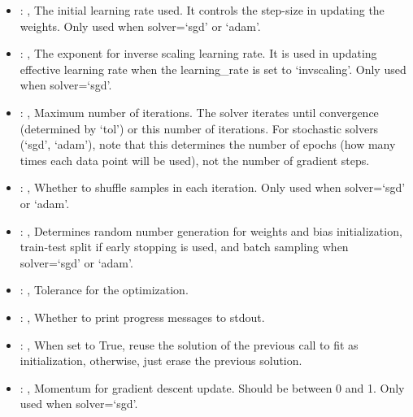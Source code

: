 \begin{itemize}
    \item {}: , 
      The initial learning rate used. It controls the step-size in updating the weights.
      Only used when solver=`sgd' or `adam'.

    \item {}: , 
      The exponent for inverse scaling learning rate. It is used in updating effective
      learning rate when the learning\_rate is set to `invscaling'. Only used when solver=`sgd'.

    \item {}: , 
      Maximum number of iterations. The solver iterates until convergence
      (determined by `tol') or this number of iterations. For stochastic solvers (`sgd', `adam'),
      note that this determines the number of epochs (how many times each data point will be used),
      not the number of gradient steps.

    \item {}: , 
      Whether to shuffle samples in each iteration. Only used when solver=`sgd' or `adam'.

    \item {}: , 
      Determines random number generation for weights and bias initialization,
      train-test split if early stopping is used, and batch sampling when solver=`sgd' or `adam'.

    \item {}: , 
      Tolerance for the optimization.

    \item {}: , 
      Whether to print progress messages to stdout.

    \item {}: , 
      When set to True, reuse the solution of the previous call to fit as initialization, otherwise,
      just erase the previous solution.

    \item {}: , 
      Momentum for gradient descent update. Should be between 0 and 1. Only used when solver=`sgd'.


\end{itemize}
